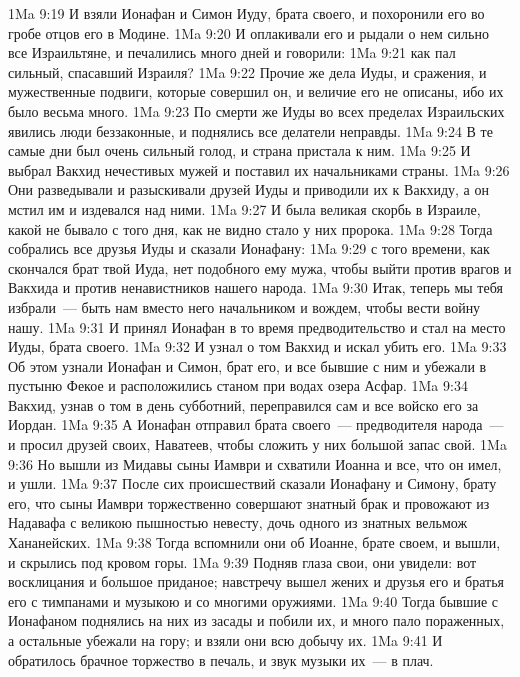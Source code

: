 \vs 1Ma 9:19 И взяли Ионафан и Симон Иуду, брата своего, и похоронили его во гробе отцов его в Модине.
\vs 1Ma 9:20 И оплакивали его и рыдали о нем сильно все Израильтяне, и печалились много дней и говорили:
\vs 1Ma 9:21 как пал сильный, спасавший Израиля?
\vs 1Ma 9:22 Прочие же дела Иуды, и сражения, и мужественные подвиги, которые совершил он, и величие его не описаны, ибо их было весьма много.
\rsbpar\vs 1Ma 9:23 По смерти же Иуды во всех пределах Израильских явились люди беззаконные, и поднялись все делатели неправды.
\vs 1Ma 9:24 В те самые дни был очень сильный голод, и страна пристала к ним.
\vs 1Ma 9:25 И выбрал Вакхид нечестивых мужей и поставил их начальниками страны.
\vs 1Ma 9:26 Они разведывали и разыскивали друзей Иуды и приводили их к Вакхиду, а он мстил им и издевался над ними.
\vs 1Ma 9:27 И была великая скорбь в Израиле, какой не бывало с того дня, как не видно стало у них пророка.
\vs 1Ma 9:28 Тогда собрались все друзья Иуды и сказали Ионафану:
\vs 1Ma 9:29 с того времени, как скончался брат твой Иуда, нет подобного ему мужа, чтобы выйти против врагов и Вакхида и против ненавистников нашего народа.
\vs 1Ma 9:30 Итак, теперь мы тебя избрали~--- быть нам вместо него начальником и вождем, чтобы вести войну нашу.
\vs 1Ma 9:31 И принял Ионафан в то время предводительство и стал на место Иуды, брата своего.
\vs 1Ma 9:32 И узнал о том Вакхид и искал убить его.
\vs 1Ma 9:33 Об этом узнали Ионафан и Симон, брат его, и все бывшие с ним и убежали в пустыню Фекое и расположились станом при водах озера Асфар.
\vs 1Ma 9:34 Вакхид, узнав о том в день субботний, переправился сам и все войско его за Иордан.
\vs 1Ma 9:35 А Ионафан отправил брата своего~--- предводителя народа~--- и просил друзей своих, Наватеев, чтобы сложить у них большой запас свой.
\vs 1Ma 9:36 Но вышли из Мидавы сыны Иамври и схватили Иоанна и все, что он имел, и ушли.
\vs 1Ma 9:37 После сих происшествий сказали Ионафану и Симону, брату его, что сыны Иамври торжественно совершают знатный брак и провожают из Надавафа с великою пышностью невесту, дочь одного из знатных вельмож Хананейских.
\vs 1Ma 9:38 Тогда вспомнили они об Иоанне, брате своем, и вышли, и скрылись под кровом горы.
\vs 1Ma 9:39 Подняв глаза свои, они увидели: вот восклицания и большое приданое; навстречу вышел жених и друзья его и братья его с тимпанами и музыкою и со многими оружиями.
\vs 1Ma 9:40 Тогда бывшие с Ионафаном поднялись на них из засады и побили их, и много пало пораженных, а остальные убежали на гору; и взяли они всю добычу их.
\vs 1Ma 9:41 И обратилось брачное торжество в печаль, и звук музыки их~--- в плач.
